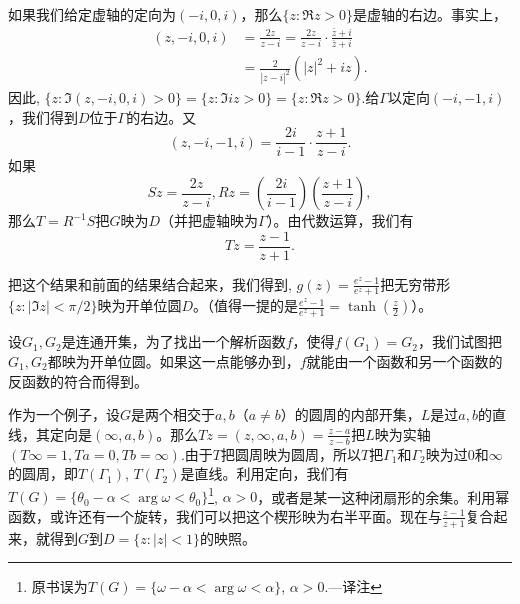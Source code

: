 如果我们给定虚轴的定向为$(-i, 0, i)$，那么$\{z:\Re{z} > 0\}$是虚轴的右边。事实上，
\[
\begin{aligned}
(z, -i, 0, i) &= \frac{2z}{z-i} = \frac{2z}{z-i} \cdot \frac{\bar{z}+i}{\bar{z}+i}\\
&=\frac{2}{|z-i|^2}(|z|^2 + iz).
\end{aligned}
\]
因此, $\{z: \Im{(z, -i, 0, i)} > 0\} = \{z: \Im{iz} > 0\} = \{z:\Re{z} > 0\}$.给$\Gamma$以定向$(-i, -1, i)$，我们得到$D$位于$\Gamma$的右边。又
\[
(z, -i, -1, i) = \frac{2i}{i-1} \cdot \frac{z+1}{z-i}.
\]
如果
\[
Sz = \frac{2z}{z-i}, Rz = (\frac{2i}{i-1})(\frac{z+1}{z-i}),
\]
那么$T = R^{-1}S$把$G$映为$D$（并把虚轴映为$\Gamma$）。由代数运算，我们有
\[
Tz = \frac{z-1}{z+1}.
\]

把这个结果和前面的结果结合起来，我们得到, $g(z) = \frac{e^z-1}{e^z+1}$把无穷带形$\{z:|\Im{z}|<\pi/2\}$映为开单位圆$D$。（值得一提的是$\frac{e^z-1}{e^z+1} = \tanh(\frac{z}{2})$）。

设$G_1, G_2$是连通开集，为了找出一个解析函数$f$，使得$f(G_1)=G_2$，我们试图把$G_1, G_2$都映为开单位圆。如果这一点能够办到，$f$就能由一个函数和另一个函数的反函数的符合而得到。

作为一个例子，设$G$是两个相交于$a, b$（$a \neq b$）的圆周的内部开集，$L$是过$a, b$的直线，其定向是$(\infty, a, b)$。那么$Tz = (z, \infty, a, b) = \frac{z-a}{z-b}$把$L$映为实轴$(T\infty = 1,Ta=0, Tb=\infty)$.由于$T$把圆周映为圆周，所以$T$把$\Gamma_1$和$\Gamma_2$映为过$0$和$\infty$的圆周，即$T(\Gamma_1)$, $T(\Gamma_2)$是直线。利用定向，我们有$T(G) = \{\theta_0 - \alpha < \arg{\omega} < \theta_0\}$\footnote{原书误为$T(G) =\{\omega-\alpha < \arg{\omega} < \alpha\}$, $\alpha>0$.---译注}, $\alpha>0$，或者是某一这种闭扇形的余集。利用幂函数，或许还有一个旋转，我们可以把这个楔形映为右半平面。现在与$\frac{z-1}{z+1}$复合起来，就得到$G$到$D = \{z:|z|<1\}$的映照。

